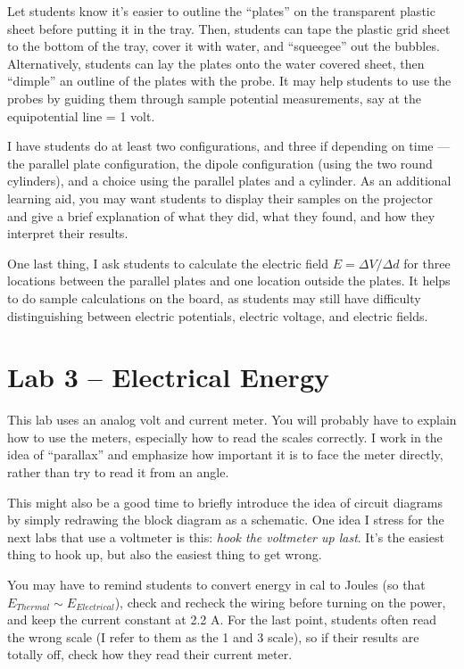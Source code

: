 Let students know it's easier to outline the ``plates'' on the transparent plastic sheet before putting it in the tray. Then, students can tape the plastic grid sheet to the bottom of the tray, cover it with water, and ``squeegee'' out the bubbles. Alternatively, students can lay the plates onto the water covered sheet, then ``dimple'' an outline of the plates with the probe. It may help students to use the probes by guiding them through sample potential measurements, say at the equipotential line = 1 volt.

I have students do at least two configurations, and three if depending on time --- the parallel plate configuration, the dipole configuration (using the two round cylinders), and a choice using the parallel plates and a cylinder. As an additional learning aid, you may want students to display their samples on the projector and give a brief explanation of what they did, what they found, and how they interpret their results.

One last thing, I ask students to calculate the electric field $E = \Delta V/\Delta d$ for three locations between the parallel plates and one location outside the plates. It helps to do sample calculations on the board, as students may still have difficulty distinguishing between electric potentials, electric voltage, and electric fields.

\section{Lab 3 -- Electrical Energy}
This lab uses an analog volt and current meter. You will probably have to explain how to use the meters, especially how to read the scales correctly. I work in the idea of ``parallax'' and emphasize how important it is to face the meter directly, rather than try to read it from an angle.

This might also be a good time to briefly introduce the idea of circuit diagrams by simply redrawing the block diagram as a schematic. One idea I stress for the next labs that use a voltmeter is this: \textsl{hook the voltmeter up last}. It's the easiest thing to hook up, but also the easiest thing to get wrong.

You may have to remind students to convert energy in cal to Joules (so that $E_{Thermal} \sim E_{Electrical}$), check and recheck the wiring before turning on the power, and keep the current constant at 2.2 A. For the last point, students often read the wrong scale (I refer to them as the 1 and 3 scale), so if their results are totally off, check how they read their current meter.

